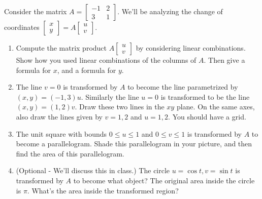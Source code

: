 \begin{problem}
Consider the matrix
$A = 
\begin{bmatrix}
 -1&2\\3&1
\end{bmatrix}.
$
We'll be analyzing the change of coordinates $\begin{bmatrix}x\\y\end{bmatrix} = A\begin{bmatrix}u\\v\end{bmatrix}$.  
\begin{enumerate}
 \item Compute the matrix product $A\begin{bmatrix}u\\v\end{bmatrix}$ by considering linear combinations. Show how you used linear combinations of the columns of $A$.  Then give a formula for $x$, and a formula for $y$. 
 \item
The line $v=0$ is transformed by $A$ to become the line parametrized by $(x,y) = (-1,3)u$. Similarly the line $u=0$ is transformed to be the line $(x,y)=(1,2)v$.  Draw these two lines in the $xy$ plane. On the same axes, also draw the lines given by $v=1,2$ and $u=1,2$.  You should have a grid. 
 \item 
The unit square with bounds $0\leq u\leq 1$ and $0\leq v\leq 1$ is transformed by $A$ to become a parallelogram.  Shade this parallelogram in your picture, and then find the area of this parallelogram. 
 \item (Optional - We'll discuss this in class.) The circle $u=\cos t, v=\sin t$ is transformed by $A$ to become what object?  The original area inside the circle is $\pi$.  What's the area inside the transformed region?
\end{enumerate}
\end{problem}





\subsection*{\ideaC}






